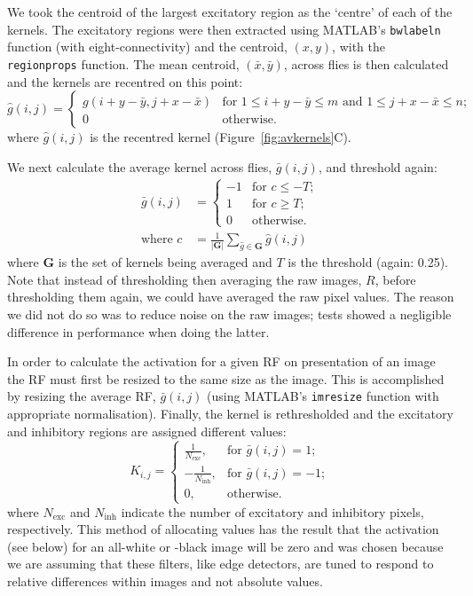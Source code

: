 \documentclass[10pt]{article}
\newcommand{\Matlab}{MATLAB}
\begin{document}
We took the centroid of the largest excitatory region as the `centre' of each of the kernels.
The excitatory regions were then extracted using \Matlab's \texttt{bwlabeln} function (with eight-connectivity) and the centroid, $(x,y)$, with the \texttt{regionprops} function.
The mean centroid, $(\bar{x},\bar{y})$, across flies is then calculated and the kernels are recentred on this point:
$$
\hat{g}(i,j) = \left\{ \begin{array}{ll} g(i+y-\bar{y},j+x-\bar{x}) & \mbox{for } 1\le i+y-\bar{y}\le m \mbox{ and } 1\le j+x-\bar{x}\le n;\\
0 & \mbox{otherwise.} \end{array} \right.
$$
where $\hat{g}(i,j)$ is the recentred kernel (Figure~\ref{fig:avkernels}C).

We next calculate the average kernel across flies, $\bar{g}(i,j)$, and threshold again:
\begin{align*}
\bar{g}(i,j) &= \left\{ \begin{array}{rl}
-1 & \mbox{for } c \le -T; \\
1 & \mbox{for } c \ge T; \\
0 & \mbox{otherwise.} 
\end{array} \right. \\
\mbox{where } c &= \frac{1}{|\mathbf{G}|}\sum\limits_{\hat{g} \in \mathbf{G}} \hat{g}(i,j)
\end{align*}
where $\mathbf{G}$ is the set of kernels being averaged and $T$ is the threshold (again: 0.25). Note that instead of thresholding then averaging the raw images, $R$, before thresholding them again, we could have averaged the raw pixel values. The reason we did not do so was to reduce noise on the raw images; tests showed a negligible difference in performance when doing the latter.

In order to calculate the activation for a given RF on presentation of an image the RF must first be resized to the same size as the image.
This is accomplished by resizing the average RF, $\bar{g}(i,j)$ (using \Matlab's \texttt{imresize} function with appropriate normalisation).
Finally, the kernel is rethresholded and the excitatory and inhibitory regions are assigned different values:
$$
K_{i,j} = \left\{
\begin{array}{rl}
\frac{1}{N_\mathrm{exc}}, & \mbox{for } \bar{g}(i,j) = 1; \\
-\frac{1}{N_\mathrm{inh}}, & \mbox{for } \bar{g}(i,j) = -1; \\
0, & \mbox{otherwise.}
\end{array}
\right.
$$
where $N_\mathrm{exc}$ and $N_\mathrm{inh}$ indicate the number of excitatory and inhibitory pixels, respectively.
This method of allocating values has the result that the activation (see below) for an all-white or -black image will be zero and was chosen because we are assuming that these filters, like edge detectors, are tuned to respond to relative differences within images and not absolute values.
\end{document}
